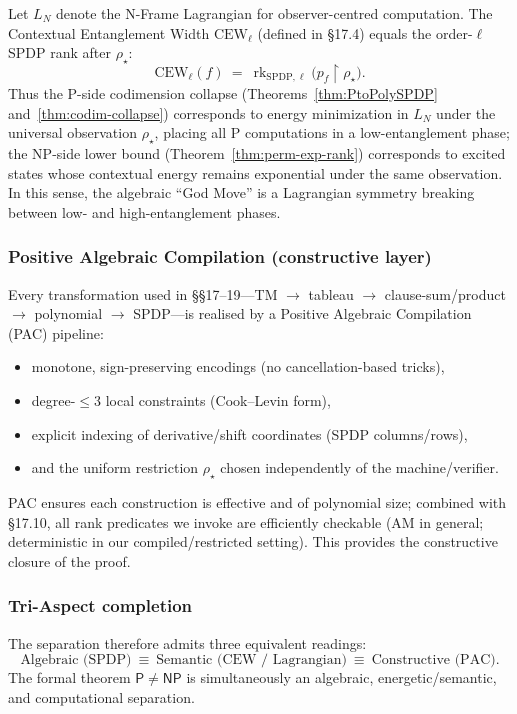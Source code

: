 \documentclass[12pt]{article}
\theoremstyle{definition}
\theoremstyle{definition}
\theoremstyle{remark}
\theoremstyle{remark}
\begin{document}
Let $L_N$ denote the N-Frame Lagrangian for observer-centred computation. The Contextual Entanglement Width $\mathrm{CEW}_\ell$ (defined in \S17.4) equals the order-$\ell$ SPDP rank after $\rho_\star$:
\[
\mathrm{CEW}_\ell(f)\ =\ \operatorname{rk}_{\mathrm{SPDP},\ell}\!\big(p_f\!\upharpoonright\rho_\star\big).
\]
Thus the P-side codimension collapse (Theorems~\ref{thm:PtoPolySPDP} and~\ref{thm:codim-collapse}) corresponds to energy minimization in $L_N$ under the universal observation $\rho_\star$, placing all P computations in a low-entanglement phase; the NP-side lower bound (Theorem~\ref{thm:perm-exp-rank}) corresponds to excited states whose contextual energy remains exponential under the same observation. In this sense, the algebraic ``God Move'' is a Lagrangian symmetry breaking between low- and high-entanglement phases.

\subsubsection{Positive Algebraic Compilation (constructive layer)}

Every transformation used in \S\S17--19---TM $\to$ tableau $\to$ clause-sum/product $\to$ polynomial $\to$ SPDP---is realised by a Positive Algebraic Compilation (PAC) pipeline:
\begin{itemize}
\item monotone, sign-preserving encodings (no cancellation-based tricks),
\item degree-$\le 3$ local constraints (Cook--Levin form),
\item explicit indexing of derivative/shift coordinates (SPDP columns/rows),
\item and the uniform restriction $\rho_\star$ chosen independently of the machine/verifier.
\end{itemize}
PAC ensures each construction is effective and of polynomial size; combined with \S17.10, all rank predicates we invoke are efficiently checkable (AM in general; deterministic in our compiled/restricted setting). This provides the constructive closure of the proof.

\subsubsection{Tri-Aspect completion}

The separation therefore admits three equivalent readings:
\[
\text{Algebraic (SPDP)}\ \equiv\ \text{Semantic (CEW / Lagrangian)}\ \equiv\ \text{Constructive (PAC)}.
\]
The formal theorem $\mathsf{P}\neq\mathsf{NP}$ is simultaneously an algebraic, energetic/semantic, and computational separation.
\end{document}
